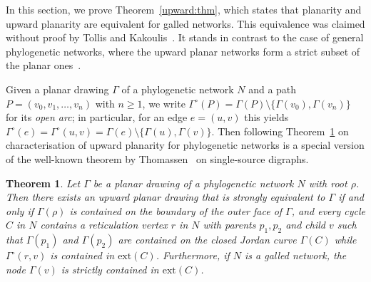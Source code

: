 \documentclass[pdflatex,sn-mathphys-num]{sn-jnl}
\theoremstyle{thmstyleone}%
\newtheorem{theorem}{Theorem}%
\theoremstyle{thmstyletwo}%
\theoremstyle{thmstylethree}%
\begin{document}
In this section, we prove Theorem~\ref{upward:thm}, which states that planarity and upward planarity are equivalent for galled networks. This equivalence was claimed without proof by Tollis and Kakoulis~\cite{TollisKakoulis2020}. It stands in contrast to the case of general phylogenetic networks, where the upward planar networks form a strict subset of the planar ones~\cite{MoultonWu2022}.



Given a planar drawing $\Gamma$ of a phylogenetic network $N$ and a path $P=(v_0,v_1,\dots,v_n)$ with $n\ge 1$, we write $\Gamma^\circ(P)=\Gamma(P)\setminus\{\Gamma(v_0),\Gamma(v_n)\}$ for its \emph{open arc}; in particular, for an edge $e=(u,v)$ this yields $\Gamma^\circ(e)=\Gamma^\circ(u,v)=\Gamma(e)\setminus\{\Gamma(u),\Gamma(v)\}$.
Then following Theorem~\ref{Phylogenetic Thomassen} on characterisation of upward planarity for phylogenetic networks is a special version of the well-known theorem by Thomassen~\cite[Theorem~5.1]{Thomassen1989} on single-source digraphs. 


\begin{theorem}\label{Phylogenetic Thomassen}
Let $\Gamma$ be a planar drawing of a phylogenetic network $N$ with root $\rho$. Then there exists an upward planar drawing that is strongly equivalent to $\Gamma$ if and only if  $\Gamma(\rho)$ is contained on the boundary of the outer face of $\Gamma$, and every cycle $C$ in $N$ contains a reticulation vertex $r$ in $N$ with parents $p_1,p_2$ and child $v$ such that $\Gamma(p_1)$ and $\Gamma(p_2)$ are contained on the closed Jordan curve $\Gamma(C)$ while $\Gamma^\circ(r,v)$ is contained in $\mathrm{ext}(C)$.
Furthermore, if $N$ is a galled network, the node $\Gamma(v)$ is strictly contained in $\mathrm{ext}(C)$.
\end{theorem}
\end{document}
